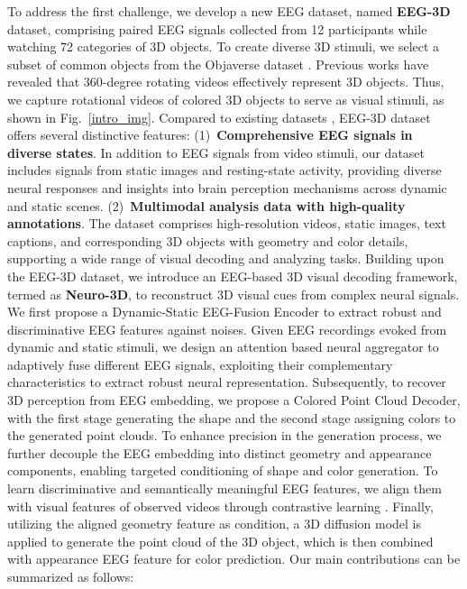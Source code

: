 To address the first challenge, we develop a new EEG dataset, named \textbf{EEG-3D} dataset, comprising paired EEG signals collected from 12 participants while watching 72 categories of 3D objects. To create diverse 3D stimuli, we select a subset of common objects from the Objaverse dataset \cite{deitke2023objaverse,xu2023pointllm}. Previous works \cite{gao2023mind,sargent2023zeronvs} have revealed that 360-degree rotating videos effectively represent 3D objects. Thus, we capture rotational videos of colored 3D objects to serve as  visual stimuli, as shown in Fig.~\ref{intro_img}.
Compared to existing datasets \cite{horikawa2017generic,chang2019bold5000,wen2018neural,gao2023mind,kavasidis2017brain2image,gifford2022large,grootswagers2022human,allen2022massive}, EEG-3D dataset offers several distinctive features: 
(1)~\textbf{Comprehensive EEG signals in diverse states}. 
In addition to EEG signals from video stimuli, our dataset includes signals from static images and resting-state activity, providing diverse neural responses and insights into brain perception mechanisms across dynamic and static scenes.
(2)~\textbf{Multimodal analysis data with high-quality annotations}. The dataset comprises high-resolution videos, static images, text captions, and corresponding 3D objects with geometry and color details, supporting a wide range of visual decoding and analyzing tasks.
Building upon the EEG-3D dataset, 
we introduce an EEG-based 3D visual decoding framework, termed as \textbf{Neuro-3D}, to reconstruct 3D visual cues from complex neural signals. 
We first propose a Dynamic-Static EEG-Fusion Encoder to extract robust and discriminative EEG features against noises. 
Given EEG recordings evoked from dynamic and static stimuli, we design an attention based neural aggregator to adaptively fuse different EEG signals, exploiting their complementary characteristics to extract robust neural representation.
Subsequently, to recover 3D perception from EEG embedding, we propose a Colored Point Cloud Decoder, with the first stage generating the shape and the second stage assigning colors to the generated point clouds. To enhance precision in the generation process, we further decouple the EEG embedding into distinct geometry and appearance components, enabling targeted conditioning of shape and color generation.
To learn discriminative and semantically meaningful EEG features,
we align them with visual features of observed videos through contrastive learning \cite{wang2020understanding}. 
Finally, utilizing the aligned geometry feature as condition, a 3D diffusion model is applied to generate the point cloud of the 3D object, which is then combined with appearance EEG feature for color prediction. 
Our main contributions can be summarized as follows:

